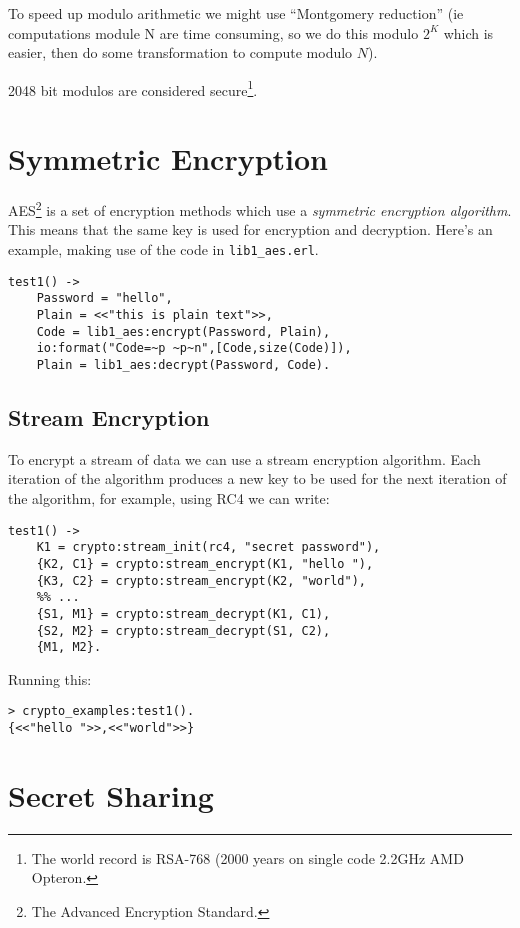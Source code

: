 \documentclass[12pt]{article}
\begin{document}
To speed up modulo arithmetic we might use ``Montgomery reduction''
(ie computations module N are time consuming, so we do this modulo
$2^K$ which is easier, then do some transformation to compute modulo
$N$).

2048 bit modulos are considered secure\footnote{The world record is
  RSA-768 (2000 years on single code 2.2GHz AMD Opteron.}.


\section{Symmetric Encryption}

AES\footnote{The Advanced Encryption Standard.} is a set of encryption
  methods which use a {\sl symmetric encryption algorithm}. This means
  that the same key is used for encryption and decryption. Here's an
  example, making use of the code in \verb+lib1_aes.erl+.

\begin{Verbatim}[frame=single]
test1() ->
    Password = "hello",
    Plain = <<"this is plain text">>,
    Code = lib1_aes:encrypt(Password, Plain),
    io:format("Code=~p ~p~n",[Code,size(Code)]),
    Plain = lib1_aes:decrypt(Password, Code).
\end{Verbatim}

\subsection{Stream Encryption}

To encrypt a stream of data we can use a stream encryption algorithm.
Each iteration of the algorithm produces a new key to be used for the
next iteration of the algorithm, for example, using RC4 we can write:

\begin{Verbatim}[frame=single]
test1() ->
    K1 = crypto:stream_init(rc4, "secret password"),
    {K2, C1} = crypto:stream_encrypt(K1, "hello "),
    {K3, C2} = crypto:stream_encrypt(K2, "world"),
    %% ...
    {S1, M1} = crypto:stream_decrypt(K1, C1),
    {S2, M2} = crypto:stream_decrypt(S1, C2),
    {M1, M2}.
\end{Verbatim}

Running this:

\begin{Verbatim}[frame=single]
> crypto_examples:test1().
{<<"hello ">>,<<"world">>}
\end{Verbatim}

\section{Secret Sharing}
\end{document}
